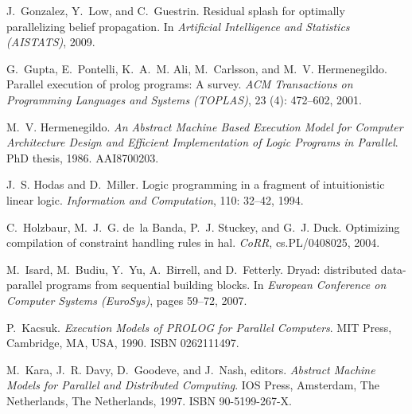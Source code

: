 \documentclass{sigplanconf}
\begin{document}
\begin{thebibliography}{35}
J.~Gonzalez, Y.~Low, and C.~Guestrin.
\newblock Residual splash for optimally parallelizing belief propagation.
\newblock In \emph{Artificial Intelligence and Statistics (AISTATS)}, 2009.

G.~Gupta, E.~Pontelli, K.~A.~M. Ali, M.~Carlsson, and M.~V. Hermenegildo.
\newblock Parallel execution of prolog programs: {A} survey.
\newblock \emph{ACM Transactions on Programming Languages and Systems
  (TOPLAS)}, 23 (4): 472--602, 2001.

M.~V. Hermenegildo.
\newblock \emph{An Abstract Machine Based Execution Model for Computer
  Architecture Design and Efficient Implementation of Logic Programs in
  Parallel}.
\newblock PhD thesis, 1986.
\newblock AAI8700203.

J.~S. Hodas and D.~Miller.
\newblock Logic programming in a fragment of intuitionistic linear logic.
\newblock \emph{Information and Computation}, 110: 32--42, 1994.

C.~Holzbaur, M.~J.~G. de~la Banda, P.~J. Stuckey, and G.~J. Duck.
\newblock Optimizing compilation of constraint handling rules in hal.
\newblock \emph{CoRR}, cs.PL/0408025, 2004.

M.~Isard, M.~Budiu, Y.~Yu, A.~Birrell, and D.~Fetterly.
\newblock Dryad: distributed data-parallel programs from sequential building
  blocks.
\newblock In \emph{European Conference on Computer Systems (EuroSys)}, pages
  59--72, 2007.

P.~Kacsuk.
\newblock \emph{Execution Models of PROLOG for Parallel Computers}.
\newblock MIT Press, Cambridge, MA, USA, 1990.
\newblock ISBN 0262111497.

M.~Kara, J.~R. Davy, D.~Goodeve, and J.~Nash, editors.
\newblock \emph{Abstract Machine Models for Parallel and Distributed
  Computing}.
\newblock IOS Press, Amsterdam, The Netherlands, The Netherlands, 1997.
\newblock ISBN 90-5199-267-X.


\end{thebibliography}
\end{document}
